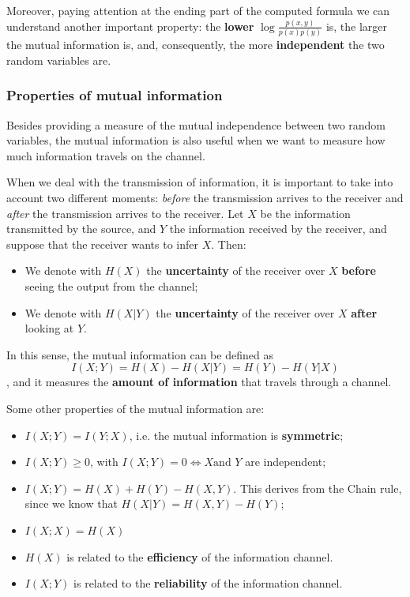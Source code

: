 Moreover, paying attention at the ending part of the computed formula we can understand another important property: the \textbf{lower} $\log \frac{p(x,y)}{p(x)p(y)} $ is, the larger the mutual information is, and, consequently, the more \textbf{independent} the two random variables are. 

\subsubsection{Properties of mutual information}
Besides providing a measure of the mutual independence between two random variables, the mutual information is also useful when we want to measure how much information travels on the channel.


When we deal with the transmission of information, it is important to take into account two different moments: \textit{before} the transmission arrives to the receiver and \textit{after} the transmission arrives to the receiver. Let $X$ be the information transmitted by the source, and $Y$ the information received by the receiver, and suppose that the receiver wants to infer $X$. Then:

\begin{itemize}
	\item We denote with $H(X)$ the \textbf{uncertainty} of the receiver over $X$ \textbf{before} seeing the output from the channel;
	\item We denote with $H(X|Y)$ the \textbf{uncertainty} of the receiver over $X$ \textbf{after} looking at $Y$.
\end{itemize}

In this sense, the mutual information can be defined as
$$I(X;Y) = H(X) - H(X|Y) = H(Y) - H(Y|X)$$
, and it measures the \textbf{amount of information} that travels through a channel.

Some other properties of the mutual information are:

\begin{itemize}
    \item $I(X;Y) = I(Y;X)$, i.e. the mutual information is \textbf{symmetric};
    \item $I(X;Y) \geq 0$, with $I(X;Y) = 0 \iff X \text{and } Y$ are independent;
    \item $I(X;Y) = H(X) + H(Y) - H(X,Y)$. This derives from the Chain rule, since we know that $H(X|Y) = H(X,Y) - H(Y)$;
    \item $I(X;X) = H(X)$
    \item $H(X)$ is related to the \textbf{efficiency} of the information channel.
    \item $I(X;Y)$ is related to the \textbf{reliability} of the information channel.
\end{itemize}

